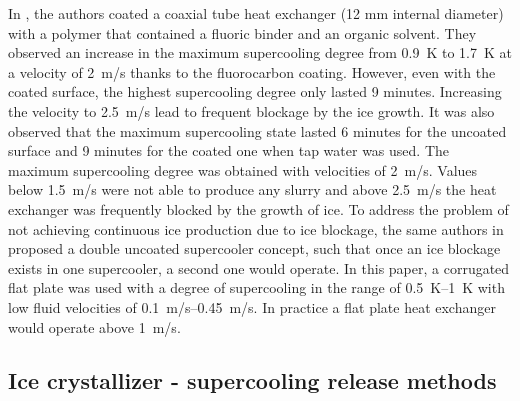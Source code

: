 In \cite{wang_experimental_2012}, the authors coated  a coaxial tube heat exchanger (12 mm internal diameter) with a polymer that contained a fluoric binder and an organic solvent. They observed an increase in the maximum supercooling degree from 0.9~K to 1.7~K at a velocity of 2~m/s thanks to the fluorocarbon coating. However, even with the coated surface, the highest supercooling degree only lasted 9 minutes. Increasing the velocity to 2.5~m/s lead to frequent blockage by the ice growth.
It was also observed that the maximum supercooling state lasted 6 minutes for the uncoated surface and 9 minutes for the coated one when tap water was used.
The maximum supercooling degree was obtained with velocities of 2~m/s. Values below 1.5~m/s were not able to produce any slurry and above 2.5~m/s the heat exchanger was frequently blocked by the growth of ice.
To address the problem of not achieving continuous ice production  due to ice blockage, the same authors in \cite{wang_investigation_2016} proposed a double uncoated supercooler concept, such that once an ice blockage exists in one supercooler, a second one would operate. In this paper, a corrugated flat plate was used with a degree of supercooling in the range of \SIrange{0.5}{1}{K} with low fluid velocities of \SIrange{0.1}{0.45}{m/s}. In practice a flat plate heat exchanger would operate above 1~m/s. 





\subsection{Ice crystallizer - supercooling release methods}
\label{section_lit_review_ice_crystallizer}


